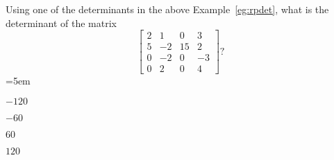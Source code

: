 \begin{activity}
Using one of the determinants in the above Example~\ref{eg:rpdet}, what is the determinant of the matrix
\begin{equation*}
\begin{bmatrix} 2&1&0&3
\\5&-2&15&2
\\0&-2&0&-3
\\0&2&0&4 \end{bmatrix} ?
\end{equation*}
\partswidth=5em
\begin{parts}
\item \(-120\)
\item \(-60\)
\item \(60\)\actans
\item \(120\)
\end{parts}
\end{activity}






